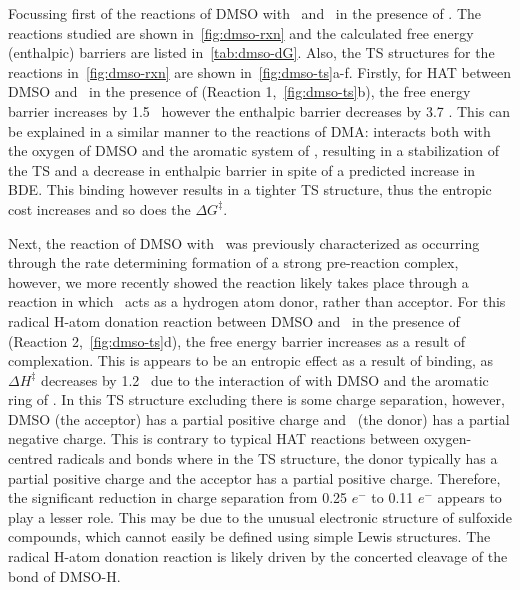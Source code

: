 \begin{doublespace}
Focussing first of the reactions of DMSO with \cumo\ and \bno\ in the presence
of . The reactions studied are shown in~\ref{fig:dmso-rxn} and the
calculated free energy (enthalpic) barriers are listed in~\ref{tab:dmso-dG}.
Also, the TS structures for the reactions in~\ref{fig:dmso-rxn} are shown
in~\ref{fig:dmso-ts}a-f. Firstly, for HAT between DMSO and \cumo\ in the
presence of  (Reaction 1,~\ref{fig:dmso-ts}b), the free energy barrier
increases by 1.5 \kcalmol\, however the enthalpic barrier decreases by 3.7
\kcalmol. This can be explained in a similar manner to the reactions of DMA:
 interacts both with the oxygen of DMSO and the aromatic system of
\cumo, resulting in a stabilization of the TS and a decrease in enthalpic
barrier in spite of a predicted increase in  BDE. This binding however
results in a tighter TS structure, thus the entropic cost increases and so does
the $\Delta G^\ddagger$.

Next, the reaction of DMSO with \bno\ was previously
characterized\cite{Salamone2012} as occurring through the rate determining
formation of a strong pre-reaction complex, however, we more recently showed the
reaction likely takes place through a reaction in which \bno\ acts as a hydrogen
atom donor, rather than acceptor.\cite{vanSanten2016} For this radical H-atom
donation reaction between DMSO and \bno\ in the presence of  (Reaction
2,~\ref{fig:dmso-ts}d), the free energy barrier increases as a result of
 complexation. This is appears to be an entropic effect as a result of
binding, as $\Delta H^\ddagger$ decreases by 1.2 \kcalmol\ due to the
interaction of  with DMSO and the aromatic ring of \bno. In this TS
structure excluding  there is some charge separation, however, DMSO
(the acceptor) has a partial positive charge and \bno\ (the donor) has a partial
negative charge. This is contrary to typical HAT reactions between
oxygen-centred radicals and  bonds where in the TS structure, the donor
typically has a partial positive charge and the acceptor has a partial positive
charge. Therefore, the significant reduction in charge separation from 0.25
$e^-$ to 0.11 $e^-$ appears to play a lesser role. This may be due to the
unusual electronic structure of sulfoxide compounds, which cannot easily be
defined using simple Lewis structures. The radical H-atom donation reaction is
likely driven by the concerted cleavage of the  bond of DMSO-H.


\end{doublespace}
